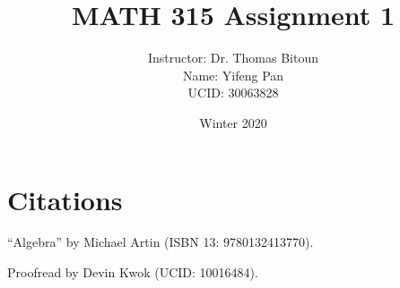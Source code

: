 \documentclass[10pt, letterpaper, titlepage]{article}
\title{MATH 315 Assignment 1}
\author{Instructor: Dr. Thomas Bitoun
    \\Name: Yifeng Pan
    \\UCID: 30063828}
\date{Winter 2020}
\begin{document}
    \maketitle

    
    
    \newpage
    
    

    \section*{Citations}
    ``Algebra'' by Michael Artin
    (ISBN 13: 9780132413770).

    Proofread by Devin Kwok
    (UCID: 10016484).
\end{document}
